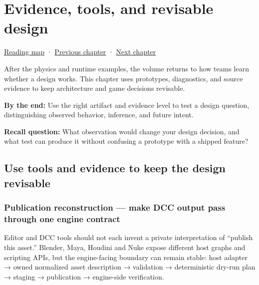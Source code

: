 \chapter{Evidence, tools, and revisable design}\label{06-engine-ii-ch041-evidence-tools-and-revisable-design}\hypertarget{06-engine-ii-ch041}{}\label{stagechapter:06-engine-ii-ch041}

\hypertarget{06-engine-ii-ch041-evidence-tools-and-revisable-design}{}

\hyperref[volume-reading-map]{Reading map} · \hyperref[05-engine-i-ch012]{Previous chapter} · \hyperref[06-engine-ii-ch046]{Next chapter}

After the physics and runtime examples, the volume returns to how teams learn whether a design works. This chapter uses prototypes, diagnostics, and source evidence to keep architecture and game decisions revisable.

\textbf{By the end:} Use the right artifact and evidence level to test a design question, distinguishing observed behavior, inference, and future intent.

\textbf{Recall question:} What observation would change your design decision, and what test can produce it without confusing a prototype with a shipped feature?

\section{Use tools and evidence to keep the design revisable}\label{06-engine-ii-ch041-use-tools-and-evidence-to-keep-the-design-revisable}

\hypertarget{06-engine-ii-ch041-use-tools-and-evidence-to-keep-the-design-revisable}{}

\subsection{Publication reconstruction --- make DCC output pass through one engine contract}\label{06-engine-ii-ch041-publication-reconstruction-make-dcc-output-pass-through-one-engine-contract}

\hypertarget{06-engine-ii-ch041-publication-reconstruction-make-dcc-output-pass-through-one-engine-contract}{}

Editor and DCC tools should not each invent a private interpretation of ``publish this asset.'' Blender, Maya, Houdini and Nuke expose different host graphs and scripting APIs, but the engine-facing boundary can remain stable: host adapter → owned normalized asset description → validation → deterministic dry-run plan → staging → publication → engine-side verification.

